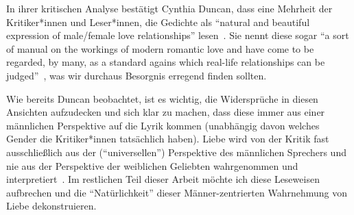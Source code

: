 In ihrer kritischen Analyse bestätigt Cynthia Duncan, dass eine Mehrheit der Kritiker*innen und Leser*innen, die Gedichte als ``natural and beautiful expression of male/female love relationships'' lesen~\cite{Duncan1992}.
Sie nennt diese sogar %
``a sort of manual on the workings of modern romantic love and have come to be regarded, by many, as a standard agains which real-life relationships can be judged''~\cite{Duncan1992}, was wir durchaus Besorgnis erregend finden sollten.

\begin{comment}
``Others who have treated Neruda's love poetry from the male perspective include: Aguirre, Alazraki, Alonso, Durán, Pérez, and Pimentel. While I do not disparage the work of these or other critics of Neruda's poetry, I feel that they have contributed to the notion that the texts are "natural" reflections of male/female relationships and that the position of the woman in the texts is an enviable one. To my knowledge, the only critics to date who have acknowledged that the asence of a feminine perspective in Neruda's poetry is problematic are John Felstiner and Marjorie Agosin.''

\end{comment}

Wie bereits Duncan beobachtet, ist es wichtig, die Widersprüche in diesen Ansichten aufzudecken
und sich klar zu machen, dass diese immer aus einer männlichen Perspektive auf die Lyrik kommen (unabhängig davon welches Gender die Kritiker*innen tatsächlich haben).
Liebe wird von der Kritik fast ausschließlich aus der (``universellen'') Perspektive des männlichen Sprechers und nie aus der Perspektive der weiblichen Geliebten wahrgenommen und interpretiert~\cite{Duncan1992}.
Im restlichen Teil dieser Arbeit möchte ich diese Leseweisen aufbrechen und die ``Natürlichkeit'' dieser Männer-zentrierten Wahrnehmung von Liebe dekonstruieren.


